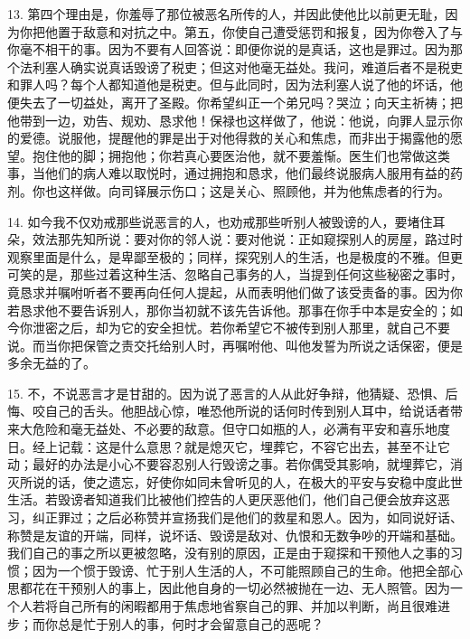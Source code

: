 13. 第四个理由是，你羞辱了那位被恶名所传的人，并因此使他比以前更无耻，因为你把他置于敌意和对抗之中。第五，你使自己遭受惩罚和报复，因为你卷入了与你毫不相干的事。因为不要有人回答说：即便你说的是真话，这也是罪过。因为那个法利塞人确实说真话毁谤了税吏；但这对他毫无益处。我问，难道后者不是税吏和罪人吗？每个人都知道他是税吏。但与此同时，因为法利塞人说了他的坏话，他便失去了一切益处，离开了圣殿。你希望纠正一个弟兄吗？哭泣；向天主祈祷；把他带到一边，劝告、规劝、恳求他！保禄也这样做了，他说：他说，向罪人显示你的爱德。说服他，提醒他的罪是出于对他得救的关心和焦虑，而非出于揭露他的愿望。抱住他的脚；拥抱他；你若真心要医治他，就不要羞惭。医生们也常做这类事，当他们的病人难以取悦时，通过拥抱和恳求，他们最终说服病人服用有益的药剂。你也这样做。向司铎展示伤口；这是关心、照顾他，并为他焦虑者的行为。\par

14. 如今我不仅劝戒那些说恶言的人，也劝戒那些听别人被毁谤的人，要堵住耳朵，效法那先知所说：要对你的邻人说：要对他说：正如窥探别人的房屋，路过时观察里面是什么，是卑鄙至极的；同样，探究别人的生活，也是极度的不雅。但更可笑的是，那些过着这种生活、忽略自己事务的人，当提到任何这些秘密之事时，竟恳求并嘱咐听者不要再向任何人提起，从而表明他们做了该受责备的事。因为你若恳求他不要告诉别人，那你当初就不该先告诉他。那事在你手中本是安全的；如今你泄密之后，却为它的安全担忧。若你希望它不被传到别人那里，就自己不要说。而当你把保管之责交托给别人时，再嘱咐他、叫他发誓为所说之话保密，便是多余无益的了。\par

15. 不，不说恶言才是甘甜的。因为说了恶言的人从此好争辩，他猜疑、恐惧、后悔、咬自己的舌头。他胆战心惊，唯恐他所说的话何时传到别人耳中，给说话者带来大危险和毫无益处、不必要的敌意。但守口如瓶的人，必满有平安和喜乐地度日。经上记载：这是什么意思？就是熄灭它，埋葬它，不容它出去，甚至不让它动；最好的办法是小心不要容忍别人行毁谤之事。若你偶受其影响，就埋葬它，消灭所说的话，使之遗忘，好使你如同未曾听见的人，在极大的平安与安稳中度此世生活。若毁谤者知道我们比被他们控告的人更厌恶他们，他们自己便会放弃这恶习，纠正罪过；之后必称赞并宣扬我们是他们的救星和恩人。因为，如同说好话、称赞是友谊的开端，同样，说坏话、毁谤是敌对、仇恨和无数争吵的开端和基础。我们自己的事之所以更被忽略，没有别的原因，正是由于窥探和干预他人之事的习惯；因为一个惯于毁谤、忙于别人生活的人，不可能照顾自己的生命。他把全部心思都花在干预别人的事上，因此他自身的一切必然被抛在一边、无人照管。因为一个人若将自己所有的闲暇都用于焦虑地省察自己的罪、并加以判断，尚且很难进步；而你总是忙于别人的事，何时才会留意自己的恶呢？\par

